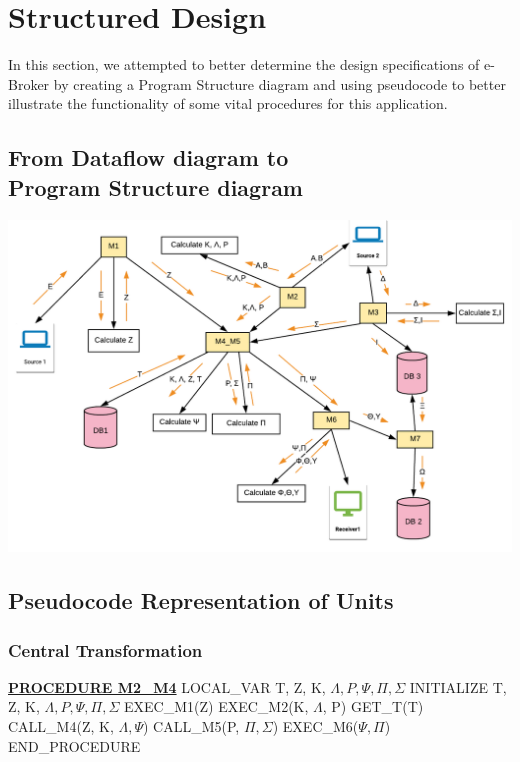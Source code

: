 \documentclass{article}
\begin{document}
\section{Structured Design}
In this section, we attempted to better determine the design specifications of e-Broker by creating a Program Structure diagram and using pseudocode to better illustrate the functionality of some vital procedures for this application. 
\subsection{From Dataflow diagram to{\\} Program Structure diagram}
\hspace*{20mm}\includegraphics[scale=0.65]{program-structure}

\subsection{Pseudocode Representation of Units}

\subsubsection{Central Transformation}
\begin{algorithmic}[H]
\STATE \underline{\textbf{PROCEDURE M2\_M4}}
	\STATE LOCAL\_VAR T, Z, K, $\Lambda, P, \Psi, \Pi, \Sigma$ 
	\STATE INITIALIZE T, Z, K, $\Lambda, P, \Psi, \Pi, \Sigma$ 
	\STATE EXEC\_M1(Z)
	\STATE EXEC\_M2(K, $\Lambda$, P)
	\STATE GET\_T(T)
	\STATE CALL\_M4(Z, K, $\Lambda, \Psi$)
	\STATE CALL\_M5(P, $\Pi, \Sigma$)
	\STATE EXEC\_M6($\Psi, \Pi$)
\STATE END\_PROCEDURE
\end{algorithmic}
\end{document}
